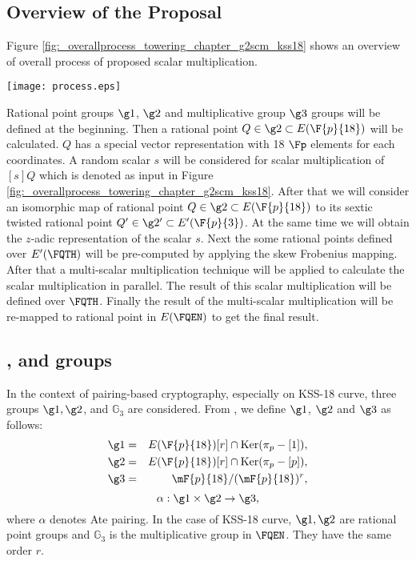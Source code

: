 \subsection{Overview of the Proposal} 
Figure \ref{fig:_overallprocess_towering_chapter_g2scm_kss18} shows an overview of overall process of proposed scalar multiplication.
\begin{figure*}[ht]
\centering
	\texttt{[image: process.eps]}
\caption{Overview of the proposed scalar multiplication for KSS-18 Curve.}
\label{fig:_overallprocess_towering_chapter_g2scm_kss18}
\end{figure*}
Rational point groups $\g1$, $\g2$ and multiplicative group $\g3$ groups will be defined at the beginning. Then a rational point $Q\in \g2 \subset E(\F{p}{18})$ will be calculated.
$Q$ has a  special vector representation with 18 $\Fp$ elements for each coordinates. 
A random scalar $s$ will be considered for scalar multiplication of $[s]Q$ which is denoted as input in  Figure \ref{fig:_overallprocess_towering_chapter_g2scm_kss18}. After that we will consider an isomorphic map of rational point $Q\in \g2 \subset E(\F{p}{18})$ to its sextic twisted rational point $Q' \in \g2' \subset E'(\F{p}{3})$. At the same time we will obtain the $z$-adic  representation of the scalar $s$. Next the some rational points defined over $E'(\FQTH)$ will be pre-computed by applying the skew Frobenius mapping. After that a multi-scalar multiplication technique will be applied to calculate the scalar multiplication in parallel. The result of this scalar multiplication will be defined over $\FQTH$. Finally the result of the multi-scalar multiplication will be re-mapped to rational point in $E(\FQEN)$ to get the final result.

\subsection{,  and  groups} In the context of pairing-based cryptography, especially on KSS-18 curve, three groups $\g1, \g2$, and $\mathbb{G}_3$ are considered. From \cite{PAIRING:MANS13}, we define $\g1$, $\g2$ and $\g3$ as follows:
\begin{eqnarray}\label{eq:g1_chapter_g2scm_kss18}
\g1 & = &  E(\F{p}{18}) [r] \cap \text{Ker}(\pi_p - [1]), \nonumber \\
\g2 & = &  E(\F{p}{18}) [r] \cap \text{Ker}(\pi_p - [p]), \nonumber \\
\g3 & = & \mF{p}{18}/(\mF{p}{18})^r, \nonumber
\end{eqnarray}
\begin{equation}
\alpha : \g1 \times \g2 \rightarrow \g3,
\end{equation}
where $\alpha$ denotes Ate pairing. In the case of KSS-18 curve, $\g1, \g2$ are rational point groups and $\mathbb{G}_3$ is the multiplicative group in $\FQEN$. They have the same order $r$. 

